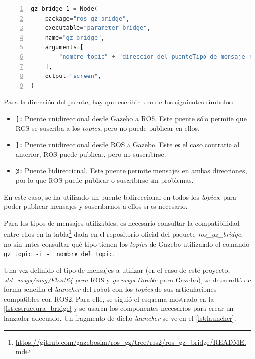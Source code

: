 \begin{lstlisting}[language=Python, caption={Estructura de un \texttt{gz\_bridge}}, label={lst:estructura_bridge}, numbers=left, backgroundcolor=\color{gray!10}]    
gz_bridge_1 = Node(
    package="ros_gz_bridge",
    executable="parameter_bridge",
    name="gz_bridge",
    arguments=[
        "nombre_topic" + "direccion_del_puenteTipo_de_mensaje_ros" + "direccion_del_puenteTipo_de_mensaje_gazebo"
    ],
    output="screen",
)
\end{lstlisting}

Para la dirección del puente, hay que escribir uno de los siguientes símbolos:

\begin{itemize}
  \item \texttt{[:} Puente unidireccional desde Gazebo a ROS. Este puente sólo permite que ROS se suscriba a los \textit{topics}, pero no puede publicar en ellos.
  \item \texttt{]:} Puente unidireccional desde ROS a Gazebo. Este es el caso contrario al anterior, ROS puede publicar, pero no suscribirse.
  \item \texttt{@:} Puente bidireccional. Este puente permite mensajes en ambas direcciones, por lo que ROS puede publicar o suscribirse sin problemas.
\end{itemize}

En este caso, se ha utilizado un puente bidireccional en todos los \textit{topics}, para poder publicar mensajes y suscribirnos a ellos si es necesario.

Para los tipos de mensajes utilizables, es necesario consultar la compatibilidad entre ellos en la tabla\footnote{\url{https://github.com/gazebosim/ros_gz/tree/ros2/ros_gz_bridge/README.md}} dada en el repositorio oficial del paquete \textit{ros\_gz\_bridge}, no sin antes consultar qué tipo tienen los \textit{topics} de Gazebo utilizando el comando \texttt{gz topic -i -t nombre\_del\_topic}.

Una vez definido el tipo de mensajes a utilizar (en el caso de este proyecto, \textit{std\_msgs/msg/Float64 para} ROS y \textit{gz.msgs.Double} para Gazebo), se desarrolló de forma sencilla el \textit{launcher} del robot con los \textit{topics} de sus articulaciones compatibles con ROS2. Para ello, se siguió el esquema mostrado en la \autoref{lst:estructura_bridge} y se usaron los componentes necesarios para crear un lanzador adecuado. Un fragmento de dicho \textit{launcher} se ve en el \autoref{lst:launcher}.

